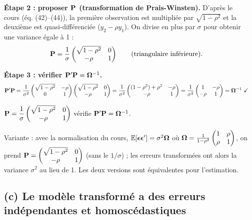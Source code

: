 \documentclass[11pt,a4paper]{article}
\newcommand{\veps}{\bm{\epsilon}}\newcommand{\vu}{\mathbf{u}}\newcommand{\vbeta}{\bm{\beta}}
\newcommand{\E}{\mathbb{E}}\newcommand{\Var}{\operatorname{Var}}\newcommand{\Cov}{\operatorname{Cov}}
\begin{document}
\textbf{Étape 2 : proposer $\mathbf{P}$ (transformation de Prais-Winsten).} D'après le cours (éq. (42)--(44)), la première observation est multipliée par $\sqrt{1-\rho^2}$ et la deuxième est quasi-différenciée ($y_2-\rho y_1$). On divise en plus par $\sigma$ pour obtenir une variance égale à 1 :
\[
\mathbf{P}=\frac1\sigma\begin{pmatrix}\sqrt{1-\rho^2}&0\\-\rho&1\end{pmatrix}\qquad\text{(triangulaire inférieure).}
\]

\textbf{Étape 3 : vérifier $\mathbf{P}'\mathbf{P}=\bm{\Omega}^{-1}$.}
\[
\Pm'\Pm=\frac1{\sigma^2}\begin{pmatrix}\sqrt{1-\rho^2}&-\rho\\0&1\end{pmatrix}\begin{pmatrix}\sqrt{1-\rho^2}&0\\-\rho&1\end{pmatrix}
=\frac1{\sigma^2}\begin{pmatrix}(1-\rho^2)+\rho^2&-\rho\\-\rho&1\end{pmatrix}
=\frac1{\sigma^2}\begin{pmatrix}1&-\rho\\-\rho&1\end{pmatrix}=\Om^{-1}\ \checkmark
\]

\begin{reponse}
$\mathbf{P}=\dfrac1\sigma\begin{pmatrix}\sqrt{1-\rho^2}&0\\-\rho&1\end{pmatrix}$ vérifie $\mathbf{P}'\mathbf{P}=\bm{\Omega}^{-1}$.

Variante : avec la normalisation du cours, $\E[\veps\veps']=\sigma^2\Om$ où $\bm{\Omega}=\frac1{1-\rho^2}\begin{pmatrix}1&\rho\\\rho&1\end{pmatrix}$, on prend $\mathbf{P}=\begin{pmatrix}\sqrt{1-\rho^2}&0\\-\rho&1\end{pmatrix}$ (sans le $1/\sigma$) ; les erreurs transformées ont alors la variance $\sigma^2$ au lieu de 1. Les deux versions sont équivalentes pour l'estimation.
\end{reponse}

\subsection*{(c) Le modèle transformé a des erreurs indépendantes et homoscédastiques}
\end{document}
